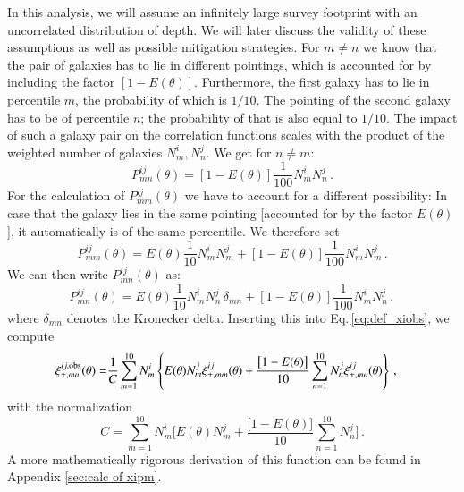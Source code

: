 In this analysis, we will assume an infinitely large survey footprint with an uncorrelated distribution of depth. We will later discuss the validity of these assumptions as well as possible mitigation strategies. For $m\neq n$ we know that the pair of galaxies has to lie in different pointings, which is accounted for by including the factor $[1-E(\theta)]$. Furthermore, the first galaxy has to lie in percentile $m$, the probability of which is $1/10$. The pointing of the second galaxy has to be of percentile $n$; the probability of that is also equal to $1/10$. The impact of such a galaxy pair on the correlation functions scales with the product of the weighted number of galaxies $N_m^i,N_n^j$. We get for $n\neq m$: \[
P_{mn}^{ij}(\theta) = [1-E(\theta)]\frac{1}{100} N_m^i N_n^j\, .
\label{eq:pmnij_corr1}
\]
For the calculation of $P_{mm}^{ij}(\theta)$ we have to account for a different possibility: In case that the galaxy lies in the same pointing [accounted for by the factor $E(\theta)$], it automatically is of the same percentile. We therefore set \[
P_{mm}^{ij}(\theta) = E(\theta)\frac{1}{10} N_m^iN_m^j + [1-E(\theta)]\frac{1}{100} N_m^i N_m^j \, .
\label{eq:pmnij_corr2}
\]
We can then write $P_{mn}^{ij}(\theta)$ as: \[
P_{mn}^{ij}(\theta) = E(\theta)\frac{1}{10} N_m^iN_n^j\,\delta_{mn} + [1-E(\theta)]\frac{1}{100} N_m^i N_n^j \, ,
\label{eq:pmnij_uncorr}
\]
where $\delta_{mn}$ denotes the Kronecker delta.
Inserting this into Eq.\,\eqref{eq:def_xiobs}, we compute
\begin{align}
\xi_{\pm,mn}^{ij,\rm{obs}}(\theta) = & \frac{1}{C}\sum_{m=1}^{10} N_m^i \left\{ E(\theta) N_m^j \xi_{\pm,mm}^{ij}(\theta) + \frac{\big[1-E(\theta)\big]}{10}\sum_{n=1}^{10}N_n^j \xi_{\pm,mn}^{ij}(\theta)\right\}\, ,
\label{eq:correctionfunction1}
\end{align}
with the normalization
\[
C = \sum_{m=1}^{10} N_m^i \bigg[ E(\theta)  N_m^j + \frac{\big[1-E(\theta)\big]}{10}\sum_{n=1}^{10} N_n^j\bigg]\, .
\]
A more mathematically rigorous derivation of this function can be found in Appendix \ref{sec:calc of xipm}.

